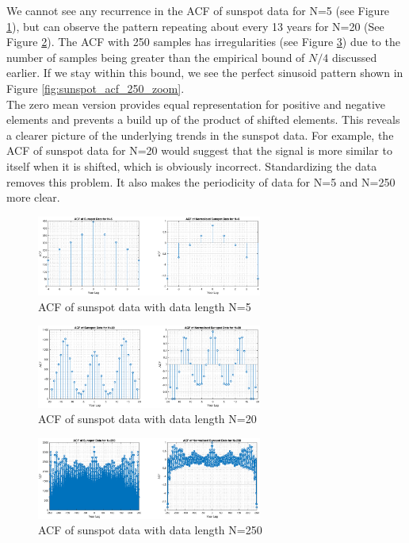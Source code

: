 \documentclass{article}
\begin{document}
We cannot see any recurrence in the ACF of sunspot data for N=5 (see Figure \ref{fig:sunspot_acf_5}), but can observe the pattern repeating about every 13 years for N=20 (See Figure \ref{fig:sunspot_acf_20}). The ACF with 250 samples has irregularities (see Figure \ref{fig:sunspot_acf_250}) due to the number of samples being greater than the empirical bound of $N/4$ discussed earlier. If we stay within this bound, we see the perfect sinusoid pattern shown in Figure \ref{fig:sunspot_acf_250_zoom}.\\

The zero mean version provides equal representation for positive and negative elements and prevents a build up of the product of shifted elements. This reveals a clearer picture of the underlying trends in the sunspot data. For example, the ACF of sunspot data for N=20 would suggest that the signal is more similar to itself when it is shifted, which is obviously incorrect. Standardizing the data removes this problem. It also makes the periodicity of data for N=5 and N=250 more clear.


\begin{figure}[h!]
\centering
\includegraphics[width = 0.66\textwidth]{sunspot_acf_5}
\caption{ACF of sunspot data with data length N=5}
\label{fig:sunspot_acf_5}
\end{figure}

\begin{figure}[h!]
\centering
\includegraphics[width = 0.66\textwidth]{sunspot_acf_20}
\caption{ACF of sunspot data with data length N=20}
\label{fig:sunspot_acf_20}
\end{figure}

\begin{figure}[h!]
\centering
\includegraphics[width = 0.66\textwidth]{sunspot_acf_250}
\caption{ACF of sunspot data with data length N=250}
\label{fig:sunspot_acf_250}
\end{figure}
\end{document}
